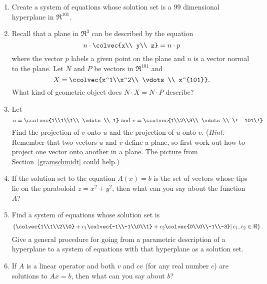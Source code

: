 \begin{enumerate}
\item Create a system of equations whose solution set is a 99 dimensional hyperplane in 
$\Re^{101}$. 

\item Recall that a plane in $\Re^3$ can be described by the equation 
\[n \cdot \colvec{x\\ y\\ z}=n\cdot p\] 
where the vector $p$ labels a given point on the plane and $n$ is a vector normal to the plane. 
Let  $N$ and $P$ be vectors in $\Re^{101}$ and 
\[X=\ccolvec{x^1\\x^2\\ \vdots\\ x^{101}}.\]
What kind of geometric object does $N\cdot X= N\cdot P$ describe?

\item 
Let
\[
u=\ccolvec{1\\1\\1\\ \vdots \\ 1} \text{~and~} v= \ccolvec{1\\2\\3\\ \vdots\\ \! 101\!} 
\]
Find the projection of $v$ onto $u$ and the projection of $u$ onto $v$.
({\itshape Hint:} Remember that  two vectors $u$ and $v$ define a plane, so first work out how to project one vector onto another
in a plane. The \hyperlink{projectionpic}{picture} from Section~\ref{gramschmidt} could help.)

\item If the solution set to the equation $A(x)=b$ is the set of vectors whose tips lie on the paraboloid $z=x^2+y^2$, then what can you say about the function $A$? 


\item Find a system of equations whose solution set is 
\[
\left\{ \colvec{1\\1\\2\\0} +c_1 \colvec{-1\\-1\\0\\1} +c_2 \colvec{0\\0\\-1\\-3}  \middle| \,c_1,c_2\in \Re 
\right\}.
\]
Give a general procedure for going from a parametric description of a hyperplane to a system of equations with  that hyperplane as a solution set.


\item If $A$ is a linear operator and both  $v$ and $cv$ (for any real number $c$) are  solutions to $Ax=b$, then what can you say about $b$? 


\end{enumerate}

